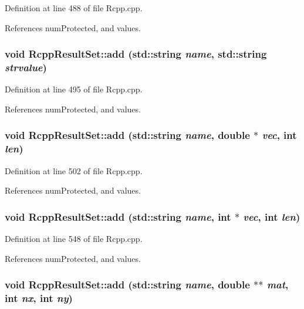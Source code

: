 Definition at line 488 of file Rcpp.cpp.

References numProtected, and values.\hypertarget{classRcppResultSet_2633372ab2f50b269e9e26dd7a489492}{
\subsubsection[add]{\setlength{\rightskip}{0pt plus 5cm}void RcppResultSet::add (std::string {\em name}, \/  std::string {\em strvalue})}}
\label{classRcppResultSet_2633372ab2f50b269e9e26dd7a489492}




Definition at line 495 of file Rcpp.cpp.

References numProtected, and values.\hypertarget{classRcppResultSet_5d06d8a4f0497abc6fad4ea22b4934f9}{
\subsubsection[add]{\setlength{\rightskip}{0pt plus 5cm}void RcppResultSet::add (std::string {\em name}, \/  double $\ast$ {\em vec}, \/  int {\em len})}}
\label{classRcppResultSet_5d06d8a4f0497abc6fad4ea22b4934f9}




Definition at line 502 of file Rcpp.cpp.

References numProtected, and values.\hypertarget{classRcppResultSet_494dbe1f6db48bf48e9e33a32d897f29}{
\subsubsection[add]{\setlength{\rightskip}{0pt plus 5cm}void RcppResultSet::add (std::string {\em name}, \/  int $\ast$ {\em vec}, \/  int {\em len})}}
\label{classRcppResultSet_494dbe1f6db48bf48e9e33a32d897f29}




Definition at line 548 of file Rcpp.cpp.

References numProtected, and values.\hypertarget{classRcppResultSet_88ff0e3db486eec0012eb58beee05e9b}{
\subsubsection[add]{\setlength{\rightskip}{0pt plus 5cm}void RcppResultSet::add (std::string {\em name}, \/  double $\ast$$\ast$ {\em mat}, \/  int {\em nx}, \/  int {\em ny})}}
\label{classRcppResultSet_88ff0e3db486eec0012eb58beee05e9b}




